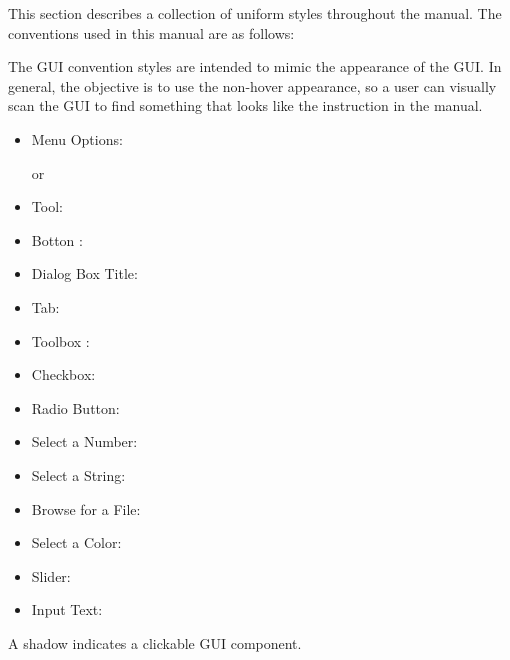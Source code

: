 
\updatedisclaimer

\label{label_conventions}

This section describes a collection of uniform styles throughout the manual. The conventions used in this manual are as follows:


The GUI convention styles are intended to mimic the appearance of the GUI. In general, the objective is to use the non-hover appearance, so a user can visually scan the GUI to find something that looks like the instruction in the manual.

\begin{itemize}[label=--,itemsep=5pt]
\item Menu Options:  \arrow
{}

or

 \arrow
{} \arrow {}
\item Tool: 
\item Botton : 
\item Dialog Box Title: 
\item Tab: 

\item Toolbox : 
\item Checkbox: 
\item Radio Button:   
\item Select a Number: 
\item Select a String: 
\item Browse for a File: \browsebutton
\item Select a Color: 
\item Slider: 
\item Input Text: 
\end{itemize}
A shadow indicates a clickable GUI component.



